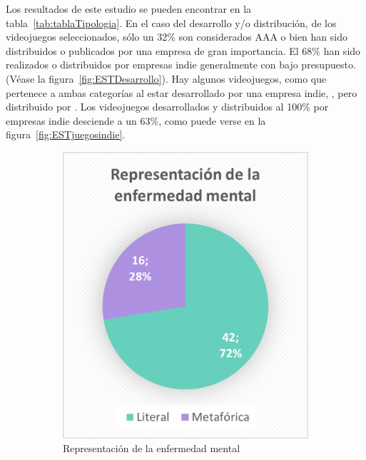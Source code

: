 \documentclass[12pt, a4paper,twoside,titlepage]{book}
\begin{document}
Los resultados de este estudio se pueden encontrar en la tabla~\ref{tab:tablaTipologia}. En el caso del desarrollo y/o distribución, de los videojuegos seleccionados, sólo un 32\% son considerados AAA o bien han sido distribuidos o publicados por una empresa de gran importancia. El 68\% han sido realizados o distribuidos por empresas indie generalmente con bajo presupuesto. (Véase la figura~\ref{fig:ESTDesarrollo}). Hay algunos videojuegos, como  que pertenece a ambas categorías al estar desarrollado por una empresa indie, \cite{supermassive}, pero distribuido por \cite{sony}. Los videojuegos desarrollados y distribuidos al 100\% por empresas indie desciende a un 63\%, como puede verse en la figura~\ref{fig:ESTjuegosindie}. 




\begin{figure}
\centering
\begin{subfigure}{.4\textwidth}
  \centering
  \includegraphics[width=.95\linewidth]{Graficas estudio/G9; Repmetlit.png}
  \caption{Representación de la enfermedad mental}
\end{subfigure}%
\begin{subfigure}{.6\textwidth}
  \centering

\end{subfigure}
\end{figure}
\end{document}
